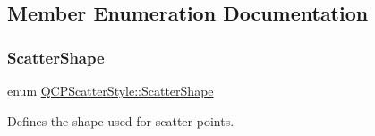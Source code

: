 \subsection{Member Enumeration Documentation}
\mbox{\label{class_q_c_p_scatter_style_adb31525af6b680e6f1b7472e43859349}} 
\subsubsection{\texorpdfstring{Scatter\+Shape}{ScatterShape}}
{\footnotesize\ttfamily enum \mbox{\hyperlink{class_q_c_p_scatter_style_adb31525af6b680e6f1b7472e43859349}{Q\+C\+P\+Scatter\+Style\+::\+Scatter\+Shape}}}

Defines the shape used for scatter points.

